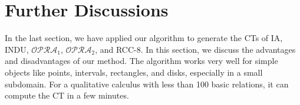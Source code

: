 \documentclass{llncs}
\newcommand{\dir}{\textsf{dir}}
\newcommand{\opra}{\mathcal{OPRA}}
\begin{document}






\section{Further Discussions}
In the last section, we have applied our algorithm to generate the CTs of IA, INDU, $\opra_1$, $\opra_2$, and RCC-8. In this section, we discuss the advantages and disadvantages of our method. The algorithm works very well for simple objects like points, intervals, rectangles, and disks, especially in a small subdomain. For a qualitative calculus with less than 100 basic relations, it can compute the CT in a few minutes.
\end{document}
